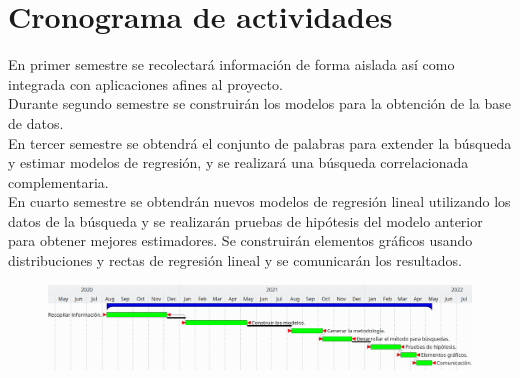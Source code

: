 \section {Cronograma de actividades}
En primer semestre se recolectará información de forma aislada así como integrada con aplicaciones afines al proyecto.\\
Durante segundo semestre se construirán los modelos para la obtención de la base de datos.\\
En tercer semestre se obtendrá el conjunto de palabras para extender la búsqueda y estimar modelos de regresión, y se realizará una búsqueda correlacionada complementaria.\\
En cuarto semestre se obtendrán nuevos modelos de regresión lineal utilizando los datos de la búsqueda y se realizarán pruebas de hipótesis del modelo anterior para obtener mejores estimadores. Se construirán elementos gráficos usando distribuciones y rectas de regresión lineal y se comunicarán los resultados.
\begin{figure}[H]\centering\includegraphics[width=1\linewidth]{gantt.png}\end{figure}